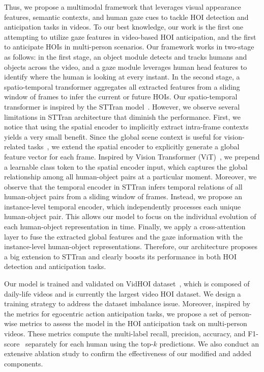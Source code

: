 \documentclass[times,twocolumn,final,authoryear]{elsarticle}
\begin{document}
Thus, we propose a multimodal framework that leverages visual appearance features, semantic contexts, and human gaze cues to tackle HOI detection and anticipation tasks in videos. To our best knowledge, our work is the first one attempting to utilize gaze features in video-based HOI anticipation, and the first to anticipate HOIs in multi-person scenarios. Our framework works in two-stage as follows: in the first stage, an object module detects and tracks humans and objects across the video, and a gaze module leverages human head features to identify where the human is looking at every instant. In the second stage, a spatio-temporal transformer aggregates all extracted features from a sliding window of frames to infer the current or future HOIs. Our spatio-temporal transformer is inspired by the STTran model~\citep{hoi_v2:sttran}. However, we observe several limitations in STTran architecture that diminish the performance. First, we notice that using the spatial encoder to implicitly extract intra-frame contexts yields a very small benefit. Since the global scene context is useful for vision-related tasks~\citep{hoi_i2:deep_contextual, detection:global_context_aware, detection:reasonable_global_context}, we extend the spatial encoder to explicitly generate a global feature vector for each frame. Inspired by Vision Transformer (ViT)~\citep{transformer:vit}, we prepend a learnable class token to the spatial encoder input, which captures the global relationship among all human-object pairs at a particular moment. Moreover, we observe that the temporal encoder in STTran infers temporal relations of all human-object pairs from a sliding window of frames. Instead, we propose an instance-level temporal encoder, which independently processes each unique human-object pair. This allows our model to focus on the individual evolution of each human-object representation in time. Finally, we apply a cross-attention layer to fuse the extracted global features and the gaze information with the instance-level human-object representations. Therefore, our architecture proposes a big extension to STTran and clearly boosts its performance in both HOI detection and anticipation tasks.

Our model is trained and validated on VidHOI dataset~\citep{hoi_v_set:VidHOI}, which is composed of daily-life videos and is currently the largest video HOI dataset. We design a training strategy to address the dataset imbalance issue. Moreover, inspired by the metrics for egocentric action anticipation tasks, we propose a set of person-wise metrics to assess the model in the HOI anticipation task on multi-person videos. These metrics compute the multi-label recall, precision, accuracy, and F1-score~\citep{metric:multi_label} separately for each human using the top-$k$ predictions. We also conduct an extensive ablation study to confirm the effectiveness of our modified and added components. 
\end{document}
